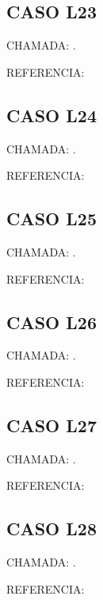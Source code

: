 \documentclass{undftex}
\begin{document}
\begin{refsection}\section*{CASO L23} CHAMADA: . \textcite{l23}\par REFERENCIA:\par\printbibliography[heading=none,check=undfconsultadas]\end{refsection}\clearpage
\begin{refsection}\section*{CASO L24} CHAMADA: . \textcite{l24}\par REFERENCIA:\par\printbibliography[heading=none,check=undfconsultadas]\end{refsection}\clearpage
\begin{refsection}\section*{CASO L25} CHAMADA: . \textcite{l25a}\par REFERENCIA:\par\printbibliography[heading=none,check=undfconsultadas]\end{refsection}\clearpage
\begin{refsection}\section*{CASO L26} CHAMADA: . \textcite{l26b}\par REFERENCIA:\par\printbibliography[heading=none,check=undfconsultadas]\end{refsection}\clearpage
\begin{refsection}\section*{CASO L27} CHAMADA: . \textcite{l27}\par REFERENCIA:\par\printbibliography[heading=none,check=undfconsultadas]\end{refsection}\clearpage
\begin{refsection}\section*{CASO L28} CHAMADA: . \textcite{l28}\par REFERENCIA:\par\printbibliography[heading=none,check=undfconsultadas]\end{refsection}\clearpage
\end{document}
